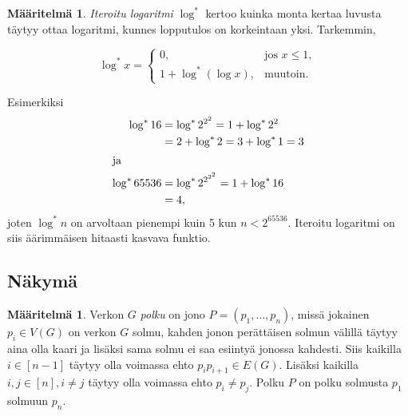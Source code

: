 \documentclass[finnish]{tktltiki2}
\theoremstyle{definition}
\newtheorem{maar}[lau]{Määritelmä}
\theoremstyle{remark}
\begin{document}
\begin{maar}
    \emph{Iteroitu logaritmi} $\log^*$ kertoo kuinka monta kertaa luvusta täytyy ottaa
    logaritmi, kunnes lopputulos on korkeintaan yksi. Tarkemmin,

    \begin{equation*}
        \log^* x =
          \begin{cases}
              0,                   &\text{jos } x \leq 1, \\
              1 + \log^* (\log x), &\text{muutoin.}
          \end{cases}
    \end{equation*}
\end{maar}

Esimerkiksi
%
\begin{align*}
    \log^* 16 &= \log^* 2^{2^2} = 1 + \log^* 2^2 \\
              &= 2+ \log^* 2 = 3 + \log^* 1 = 3 \\
\intertext{ja}
    \log^* 65536 &= \log^* 2^{2^{2^2}} = 1 + \log^* 16 \\
                 &= 4,
\end{align*}
%
joten $\log^* n$ on arvoltaan pienempi kuin 5 kun $n < 2^{65536}$. Iteroitu
logaritmi on siis äärimmäisen hitaasti kasvava funktio.

\subsection{Näkymä}

\begin{maar}
    Verkon $G$ \emph{polku} on jono $P = (p_1, \dots, p_n)$, missä jokainen
    $p_i \in V(G)$ on verkon $G$ solmu, kahden jonon perättäisen solmun välillä
    täytyy aina olla kaari ja lisäksi sama solmu ei saa esiintyä jonossa
    kahdesti. Siis kaikilla $i \in [n-1]$ täytyy olla voimassa ehto $p_i
    p_{i+1} \in E(G)$. Lisäksi kaikilla $i,j \in [n], i \neq j$ täytyy olla
    voimassa ehto $p_i \neq p_j$. Polku $P$ on polku solmusta $p_1$ solmuun
    $p_n$.
\end{maar}
\end{document}
